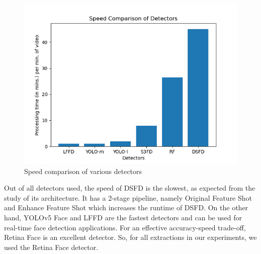 \begin{figure}[h]
  \centering
    \includegraphics[scale=0.6]{LiteratureSurvey/Result_speed}
    \caption{Speed comparison of various detectors}
    \label{fig:result_speed}
\end{figure}

Out of all detectors used, the speed of DSFD is the slowest, as expected from the study of its architecture. It has a 2-stage pipeline, namely Original Feature Shot and Enhance Feature Shot which increases the runtime of DSFD. On the other hand, YOLOv5 Face and LFFD are the fastest detectors and can be used for real-time face detection applications. For an effective accuracy-speed trade-off, Retina Face is an excellent detector. So, for all extractions in our experiments, we used the Retina Face detector.